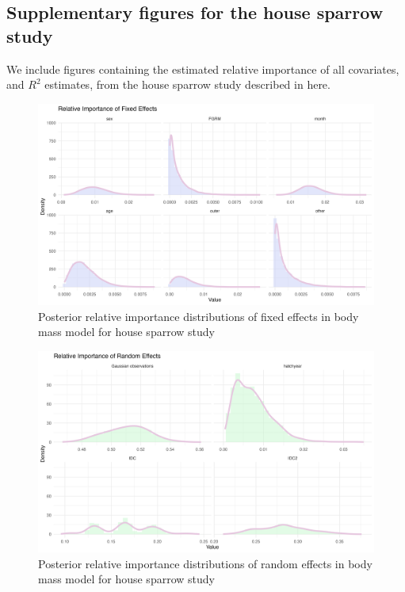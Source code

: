 \subsection*{Supplementary figures for the house sparrow study}

We include figures containing the estimated relative importance of all covariates, and $R^2$ estimates, from the house sparrow study described in  here. 

\begin{figure}[H]%
  \centering
  \includegraphics[width=1\linewidth]{Figures/House sparrow study/Mass_fixed.png}
  \caption[Posterior relative importance distributions of fixed effects in body mass model for house sparrow study]{Posterior relative importance distributions of fixed effects in body mass model for house sparrow study}
  \label{fig:mass_fixed_sparrows}
\end{figure}

\begin{figure}[H]%
  \centering
  \includegraphics[width=1\linewidth]{Figures/House sparrow study/Mass_random.png}
  \caption[Posterior relative importance distributions of random effects in body mass model for house sparrow study]{Posterior relative importance distributions of random effects in body mass model for house sparrow study}
  \label{fig:mass_random_sparrows}
\end{figure}

